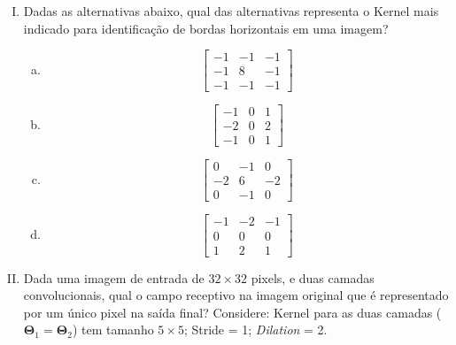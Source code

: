 \documentclass{dlproblemset}
\begin{document}
\begin{enumerate}[I)]
    $$\mathbf{X} = \begin{bmatrix}
    7 & 8 & 9 \\
    6 & 5 & 4 \\
    1 & 2 & 3
    \end{bmatrix}
    \qquad
    \mathbf{\Theta}_1 = \begin{bmatrix}
    1 & 0 & -1 \\
    1 & 0 & -1 \\
    1 & 0 & -1
    \end{bmatrix}
    \qquad
    \mathbf{\Theta}_2 = \begin{bmatrix}
    1 & 1 & 1 \\
    0 & 0 & 0 \\
    -1 & -1 & -1
    \end{bmatrix}$$


    \item Dadas as alternativas abaixo, qual das alternativas representa o Kernel mais indicado para identificação de bordas horizontais em uma imagem?
\begin{enumerate}[a)]
    \item $$\begin{bmatrix}
    -1 & -1 & -1 \\
    -1 & 8 & -1 \\
    -1 & -1 & -1
    \end{bmatrix}$$
    \item $$\begin{bmatrix}
    -1 & 0 & 1 \\
    -2 & 0 & 2 \\
    -1 & 0 & 1
    \end{bmatrix}$$
    \item $$\begin{bmatrix}
    0 & -1 & 0 \\
    -2 & 6 & -2 \\
    0 & -1 & 0
    \end{bmatrix}$$
    \item $$\begin{bmatrix}
    -1 & -2 & -1 \\
    0 & 0 & 0 \\
    1 & 2 & 1
    \end{bmatrix}$$
\end{enumerate}


    \item Dada uma imagem de entrada de $32\times32$ pixels, e duas camadas convolucionais, qual o campo receptivo na imagem original que é representado por um único pixel na saída final? Considere: Kernel para as duas camadas ($\mathbf{\Theta}_1 = \mathbf{\Theta}_2$) tem tamanho $5\times5$; Stride = 1; \textit{Dilation} = 2.


\end{enumerate}
\end{document}
